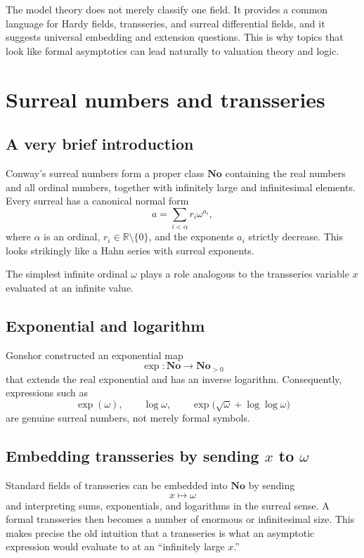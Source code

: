 \documentclass[11pt,openany]{book}
\theoremstyle{plain}
\theoremstyle{definition}
\theoremstyle{remark}
\newcommand{\R}{\mathbb{R}}
\begin{document}
\begin{advancedbox}
The model theory does not merely classify one field. It provides a common language for Hardy fields, transseries, and surreal differential fields, and it suggests universal embedding and extension questions. This is why topics that look like formal asymptotics can lead naturally to valuation theory and logic.
\end{advancedbox}

\chapter{Surreal numbers and transseries}
\label{chap:surreals}

\section{A very brief introduction}
Conway's surreal numbers form a proper class $\mathbf{No}$ containing the real numbers and all ordinal numbers, together with infinitely large and infinitesimal elements. Every surreal has a canonical normal form
\[
  a=\sum_{i<\alpha}r_i\omega^{a_i},
\]
where $\alpha$ is an ordinal, $r_i\in\R\setminus\{0\}$, and the exponents $a_i$ strictly decrease. This looks strikingly like a Hahn series with surreal exponents.

The simplest infinite ordinal $\omega$ plays a role analogous to the transseries variable $x$ evaluated at an infinite value.

\section{Exponential and logarithm}
Gonshor constructed an exponential map
\[
  \exp:\mathbf{No}\to\mathbf{No}_{>0}
\]
that extends the real exponential and has an inverse logarithm. Consequently, expressions such as
\[
  \exp(\omega),
  \qquad
  \log\omega,
  \qquad
  \exp\bigl(\sqrt\omega+\log\log\omega\bigr)
\]
are genuine surreal numbers, not merely formal symbols.

\section{\texorpdfstring{Embedding transseries by sending $x$ to $\omega$}{Embedding transseries by sending x to omega}}
Standard fields of transseries can be embedded into $\mathbf{No}$ by sending
\[
  x\longmapsto\omega
\]
and interpreting sums, exponentials, and logarithms in the surreal sense. A formal transseries then becomes a number of enormous or infinitesimal size. This makes precise the old intuition that a transseries is what an asymptotic expression would evaluate to at an ``infinitely large $x$.''
\end{document}
